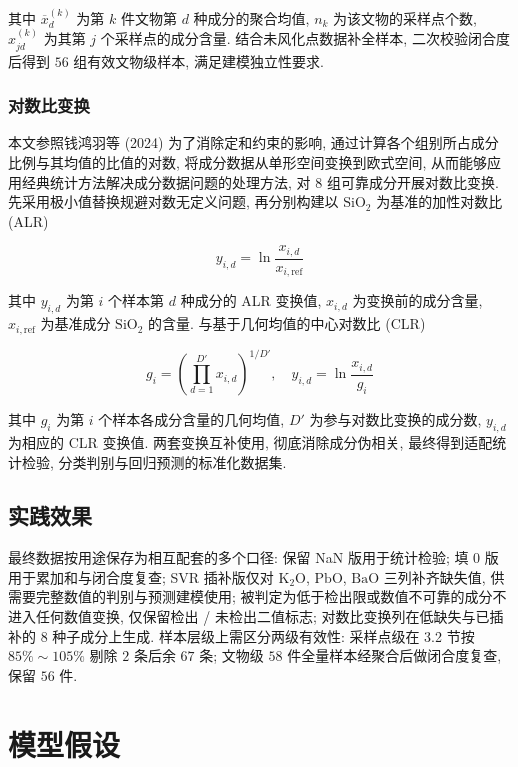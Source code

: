 \documentclass{ctexart}
\begin{document}
其中 $\overline{x}_d^{\left(k\right)}$ 为第 $k$ 件文物第 $d$ 种成分的聚合均值, $n_k$ 为该文物的采样点个数, $x_{jd}^{\left(k\right)}$ 为其第 $j$ 个采样点的成分含量. 结合未风化点数据补全样本, 二次校验闭合度后得到 $56$ 组有效文物级样本, 满足建模独立性要求.


\subsubsection{对数比变换}

本文参照钱鸿羽等 (2024) \cite{qianhongyu2024}为了消除定和约束的影响, 通过计算各个组别所占成分比例与其均值的比值的对数, 将成分数据从单形空间变换到欧式空间, 从而能够应用经典统计方法解决成分数据问题的处理方法, 对 $8$ 组可靠成分开展对数比变换. 先采用极小值替换规避对数无定义问题, 再分别构建以 $\mathrm{SiO_2}$ 为基准的加性对数比 (ALR)

\begin{equation*}
y_{i,d}=\ln\frac{x_{i,d}}{x_{i,\mathrm{ref}}}
\end{equation*}

其中 $y_{i,d}$ 为第 $i$ 个样本第 $d$ 种成分的 ALR 变换值, $x_{i,d}$ 为变换前的成分含量, $x_{i,\mathrm{ref}}$ 为基准成分 $\mathrm{SiO_2}$ 的含量. 与基于几何均值的中心对数比 (CLR)

\begin{equation*}
g_{i}=\left(\prod_{d=1}^{D'}x_{i,d}\right)^{1/D'},\quad{}y_{i,d}=\ln\frac{x_{i,d}}{g_{i}}
\end{equation*}

其中 $g_i$ 为第 $i$ 个样本各成分含量的几何均值, $D'$ 为参与对数比变换的成分数, $y_{i,d}$ 为相应的 CLR 变换值. 两套变换互补使用, 彻底消除成分伪相关, 最终得到适配统计检验, 分类判别与回归预测的标准化数据集.

\subsection{实践效果}

最终数据按用途保存为相互配套的多个口径: 保留 NaN 版用于统计检验; 填 $0$ 版用于累加和与闭合度复查; SVR 插补版仅对 $\mathrm{K_2O}$, $\mathrm{PbO}$, $\mathrm{BaO}$ 三列补齐缺失值, 供需要完整数值的判别与预测建模使用; 被判定为低于检出限或数值不可靠的成分不进入任何数值变换, 仅保留检出 / 未检出二值标志; 对数比变换列在低缺失与已插补的 $8$ 种子成分上生成. 样本层级上需区分两级有效性: 采样点级在 3.2 节按 $85\%\sim105\%$ 剔除 $2$ 条后余 $67$ 条; 文物级 $58$ 件全量样本经聚合后做闭合度复查, 保留 $56$ 件.

\section{模型假设}
\end{document}

